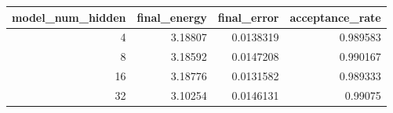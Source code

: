 \begin{tabular}{rrrr}
\toprule
model_num_hidden & final_energy & final_error & acceptance_rate \\
\midrule
4 & 3.18807 & 0.0138319 & 0.989583 \\
8 & 3.18592 & 0.0147208 & 0.990167 \\
16 & 3.18776 & 0.0131582 & 0.989333 \\
32 & 3.10254 & 0.0146131 & 0.99075 \\
\bottomrule
\end{tabular}
